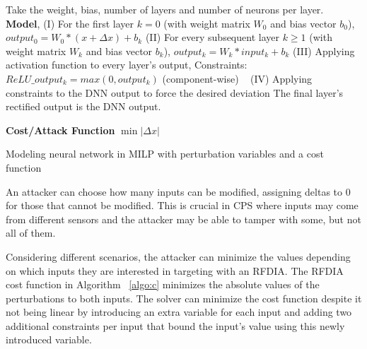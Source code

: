 \begin{algorithm}
	Take the weight, bias, number of layers and number of neurons per layer. \\
	
	\textbf{Model}, \linebreak
	(I) For the first layer $k = 0$ (with weight matrix $W_0$ and bias vector $b_0$), $output_0 = W_0 * (x + \Delta x) + b_k$
	\linebreak
	(II) For every subsequent layer $k \geq 1$ (with weight matrix $W_k$ and bias vector $b_k$), $output_k = W_k * input_k + b_k$
	\linebreak
	(III) Applying activation function to every layer's output,
	\linebreak
	Constraints: $ReLU\_output_k = max(0, output_k)$ (component-wise) \
	\linebreak
	(IV) Applying constraints to the DNN output to force the desired deviation
	\linebreak
	The final layer's rectified output is the DNN output.
	
	\textbf{Cost/Attack Function} \linebreak
	$\min |\Delta x|$
	\caption{Modeling neural network in MILP with perturbation variables and a cost function}
	\label{algo:c}
\end{algorithm}

An attacker can choose how many inputs can be modified, assigning deltas to $0$ for those that cannot be modified. 
This is crucial in \ac{CPS} where inputs may come from different sensors and the attacker may be able to tamper with some, but not all of them.

Considering different scenarios, the attacker can minimize the values depending on which inputs they are interested in targeting with an \ac{RFDIA}. 
The \ac{RFDIA} cost function in Algorithm ~\ref{algo:c} minimizes the absolute values of the perturbations to both inputs.
The solver can minimize the cost function despite it not being linear by introducing an extra variable for each input and adding two additional constraints per input that bound the input's value using this newly introduced variable. 



